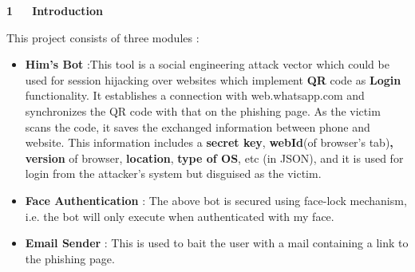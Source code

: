 \documentclass[12pt]{article}
\renewcommand{\_}{\kern-1.5pt\textunderscore\kern-1.5pt}
\begin{document}
\vspace{\baselineskip}

\vspace{\baselineskip}

\vspace{\baselineskip}

\vspace{\baselineskip}

\vspace{\baselineskip}

\vspace{\baselineskip}

\vspace{\baselineskip}

\vspace{\baselineskip}

\vspace{\baselineskip}

\vspace{\baselineskip}
\begin{FlushLeft}
{\fontsize{18pt}{21.6pt}\selectfont \textbf{1\ \ \  Introduction }\par}
\end{FlushLeft}\par

\begin{FlushLeft}
This project consists of three modules :
\end{FlushLeft}\par

\begin{itemize}
	\item \textbf{Him’s Bot} :This tool is a social engineering attack vector which could be used for session hijacking over websites which implement \textbf{QR} code as \textbf{Login} functionality. It establishes a connection with web.whatsapp.com and synchronizes the QR code with that on the phishing page. As the victim scans the code, it saves the exchanged information between phone and website. This information includes a \textbf{secret key}, \textbf{webId}(of browser’s tab)\textbf{, version }of browser, \textbf{location}, \textbf{type of OS}, etc (in JSON), and it is used for login from the attacker's system but disguised as the victim.\par

	\item \textbf{Face Authentication} : The above bot is secured using face-lock mechanism, i.e. the bot will only execute when authenticated with my face.\par

	\item \textbf{Email Sender} : This is used to bait the user with a mail containing a link to the phishing page.
\end{itemize}\par
\end{document}
